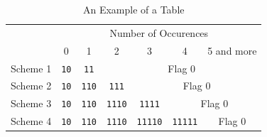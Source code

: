\documentclass[10pt,conference,a4paper,nofonttune]{IEEEtran}
\begin{document}
\begin{table}[!t] \centering
   \caption{An Example of a Table}
   \label{Tbl:Example}
   {
      \footnotesize
      \renewcommand{\arraystretch}{1.2}
      \begin{tabular}{c|c|c|c|c|c|c}
\hline\hline
        & \multicolumn{6}{c}{Number of Occurences} \\\cline{2-7}
        & 0 & 1 & 2 & 3 & 4 & 5 and more \\\hline
Scheme 1&\texttt{10}&\texttt{11} &\multicolumn{4}{c}{\scriptsize Flag 0} \\\hline
Scheme 2&\texttt{10}&\texttt{110}&\texttt{111} &\multicolumn{3}{c}{\scriptsize Flag 0}\\\hline
Scheme 3&\texttt{10}&\texttt{110}&\texttt{1110}&\texttt{1111} &\multicolumn{2}{c}{\scriptsize Flag 0} \\\hline
Scheme 4&\texttt{10}&\texttt{110}&\texttt{1110}&\texttt{11110}&\texttt{11111}&{\scriptsize Flag 0}\\\hline
\hline
      \end{tabular}
   }
\end{table}
\end{document}

